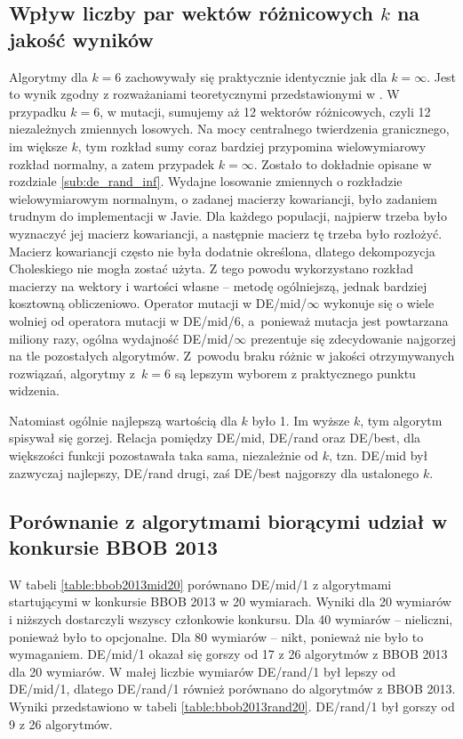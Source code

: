 \documentclass[a4paper,onecolumn,oneside,12pt,wide,floatssmall]{mwrep}
\theoremstyle{definition}
\theoremstyle{plain}%
\theoremstyle{remark}
\begin{document}
\subsection{Wpływ liczby par wektów różnicowych $k$ na jakość wyników}

Algorytmy dla $k = 6$ zachowywały się praktycznie identycznie jak dla $k = \infty$. 
Jest to wynik zgodny
z rozważaniami teoretycznymi przedstawionymi w \cite{decomposition}. 
W przypadku $k = 6$, w mutacji, sumujemy aż 12 wektorów różnicowych,
czyli 12 niezależnych zmiennych losowych. Na mocy centralnego twierdzenia granicznego,
im większe $k$, tym rozkład sumy coraz bardziej przypomina wielowymiarowy rozkład normalny,
a zatem przypadek $k=\infty$. Zostało to dokładnie opisane w rozdziale \ref{sub:de_rand_inf}.
Wydajne losowanie zmiennych o rozkładzie wielowymiarowym normalnym, o zadanej
macierzy kowariancji, było zadaniem trudnym do implementacji w Javie.
Dla każdego populacji, najpierw trzeba było wyznaczyć jej macierz kowariancji, a następnie macierz
tę trzeba było rozłożyć. Macierz kowariancji często nie była dodatnie określona, 
dlatego dekompozycja Choleskiego nie mogła zostać użyta.
Z tego powodu wykorzystano rozkład macierzy na wektory i wartości własne -- metodę ogólniejszą, jednak
bardziej kosztowną obliczeniowo. Operator mutacji w DE/mid/$\infty$ wykonuje się o wiele
wolniej od operatora mutacji w DE/mid/6, a~ponieważ mutacja jest powtarzana miliony
razy, ogólna wydajność DE/mid/$\infty$ prezentuje się zdecydowanie najgorzej na tle pozostałych
algorytmów. Z~powodu braku różnic w jakości otrzymywanych rozwiązań,
algorytmy z~$k = 6$ są lepszym wyborem z praktycznego punktu widzenia.

Natomiast ogólnie najlepszą wartością dla $k$ było 1. Im wyższe $k$, tym algorytm spisywał się gorzej.
Relacja pomiędzy DE/mid, DE/rand oraz DE/best, dla większości funkcji pozostawała taka sama, 
niezależnie od $k$, tzn. DE/mid był zazwyczaj najlepszy, DE/rand drugi, zaś DE/best najgorszy
dla ustalonego $k$. 

\subsection{Porównanie z algorytmami biorącymi udział w konkursie BBOB 2013}

W tabeli \ref{table:bbob2013mid20} porównano DE/mid/1 z algorytmami startującymi w konkursie BBOB 2013
w 20 wymiarach.
Wyniki dla 20 wymiarów i niższych dostarczyli wszyscy członkowie konkursu. 
Dla 40 wymiarów -- nieliczni, ponieważ było to opcjonalne.
Dla 80 wymiarów -- nikt, ponieważ nie było to wymaganiem.
DE/mid/1 okazał się gorszy od 17 z 26 algorytmów z BBOB 2013 dla 20 wymiarów. 
W małej liczbie wymiarów DE/rand/1 był lepszy od DE/mid/1, dlatego 
DE/rand/1 również porównano do algorytmów z BBOB 2013. 
Wyniki przedstawiono w tabeli \ref{table:bbob2013rand20}. 
DE/rand/1 był gorszy od 9 z 26 algorytmów.
\end{document}
